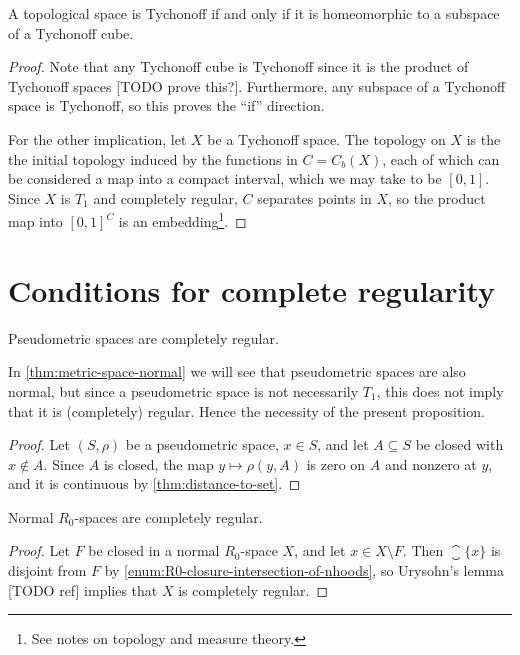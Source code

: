 \documentclass[article, a4paper, 11pt, oneside]{memoir}
\numberwithin{equation}{chapter}
\begin{document}
\begin{proposition}
    \label{prop:Tychonoff-cube-embedding}
    A topological space is Tychonoff if and only if it is homeomorphic to a subspace of a Tychonoff cube.
\end{proposition}

\begin{proof}
    Note that any Tychonoff cube is Tychonoff since it is the product of Tychonoff spaces [TODO prove this?]. Furthermore, any subspace of a Tychonoff space is Tychonoff, so this proves the \enquote{if} direction.

    For the other implication, let $X$ be a Tychonoff space. The topology on $X$ is the the initial topology induced by the functions in $C = C_b(X)$, each of which can be considered a map into a compact interval, which we may take to be $[0,1]$. Since $X$ is $T_1$ and completely regular, $C$ separates points in $X$, so the product map into $[0,1]^C$ is an embedding\footnote{See notes on topology and measure theory.}.
\end{proof}


\section{Conditions for complete regularity}

\begin{proposition}
    \label{thm:pseudometric-completely-regular}
    Pseudometric spaces are completely regular.
\end{proposition}
%
In \cref{thm:metric-space-normal} we will see that pseudometric spaces are also normal, but since a pseudometric space is not necessarily $T_1$, this does not imply that it is (completely) regular. Hence the necessity of the present proposition.

\begin{proof}
    Let $(S,\rho)$ be a pseudometric space, $x \in S$, and let $A \subseteq S$ be closed with $x \not\in A$. Since $A$ is closed, the map $y \mapsto \rho(y,A)$ is zero on $A$ and nonzero at $y$, and it is continuous by \cref{thm:distance-to-set}.
\end{proof}


\begin{proposition}
    Normal $R_0$-spaces are completely regular.
\end{proposition}

\begin{proof}
    Let $F$ be closed in a normal $R_0$-space $X$, and let $x \in X \setminus F$. Then $\closure{\{x\}}$ is disjoint from $F$ by 
    \cref{enum:R0-closure-intersection-of-nhoods}, so Urysohn's lemma [TODO ref] implies that $X$ is completely regular.
\end{proof}
\end{document}
